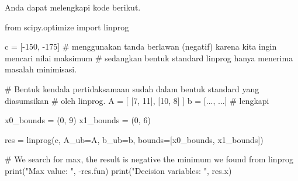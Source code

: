 Anda dapat melengkapi kode berikut.
\begin{pythoncode}
from scipy.optimize import linprog

c = [-150, -175]
# menggunakan tanda berlawan (negatif) karena kita ingin mencari nilai maksimum
# sedangkan bentuk standard linprog hanya menerima masalah minimisasi.

# Bentuk kendala pertidaksamaan sudah dalam bentuk standard yang diasumsikan
# oleh linprog.
A = [
    [7, 11],
    [10, 8]
]
b = [..., ...] # lengkapi

x0_bounds = (0, 9)
x1_bounds = (0, 6)

res = linprog(c, A_ub=A, b_ub=b, bounds=[x0_bounds, x1_bounds])

# We search for max, the result is negative the minimum we found from linprog
print("Max value: ", -res.fun)
print("Decision variables: ", res.x)
\end{pythoncode}

